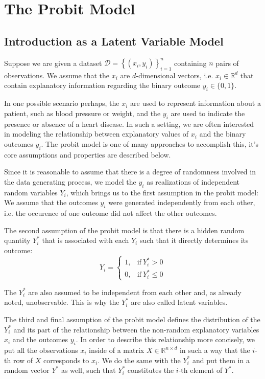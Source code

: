 \section{The Probit Model}

\subsection{Introduction as a Latent Variable Model}

Suppose we are given a dataset
$\mathcal{D} = \left\{ (x_i, y_i) \right\}_{i=1}^n$
containing $n$ pairs of observations.
We assume that the $x_i$ are $d$-dimensional vectors, i.e.
$x_i \in \mathbb{R}^d$ that contain explanatory information regarding
the binary outcome $y_i \in \{ 0,  1 \}$.

In one possible scenario perhaps, the $x_i$ are used to represent information
about a patient, such as blood pressure or weight, and the $y_i$ are used to indicate
the presence or absence of a heart disease.
In such a setting, we are often interested in modeling the relationship
between explanatory values of $x_i$ and the binary outcomes $y_i$.
The probit model is one of many approaches to accomplish this, it's
core assumptions and properties are described below.

Since it is reasonable to assume that there is a degree of randomness
involved in the data generating process, we model the $y_i$ as realizations
of independent random variables $Y_i$,
which brings us to the first assumption in the probit model:
We assume that the outcomes $y_i$ were generated independently
from each other, i.e. the occurence of one outcome did not affect
the other outcomes.

The second assumption of the probit model is that there is
a hidden random quantity
$Y_i^\ast$ that is associated with each $Y_i$ such that it
directly determines its outcome:
\begin{equation}
    Y_i =
    \begin{cases}
        1, & \text{if}\ Y_i^\ast > 0    \\
        0, & \text{if}\ Y_i^\ast \leq 0
    \end{cases}
\end{equation}

\noindent The $Y_i^\ast$ are also assumed to be independent from each
other and, as already noted, unobservable.
This is why the $Y_i^\ast$ are also called latent variables.

The third and final assumption of the probit model defines the
distribution of the $Y_i^\ast$ and its part of the relationship
between the non-random explanatory variables $x_i$ and the outcomes $y_i$.
In order to describe this relationship more concisely,
we put all the observations $x_i$ inside of a
matrix $X \in \mathbb{R}^{n \times d}$ in such a way that
the $i$-th row of $X$ corresponds to $x_i$.
We do the same with the $Y_i^\ast$ and put them in a
random vector $Y^\ast$ as well, such that $Y_i^\ast$ constitutes
the $i$-th element of $Y^\ast$.

